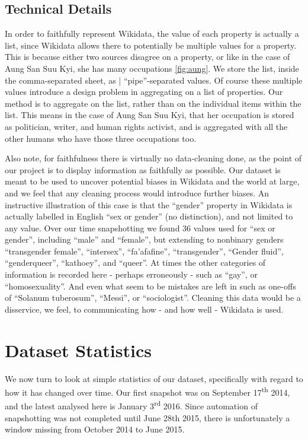 \documentclass[letterpaper]{article}
\begin{document}
\subsection{Technical Details}
In order to faithfully represent Wikidata, the value of each property is actually a list, since Wikidata allows there to potentially be multiple values for a property. This is because either two sources disagree on a property, or like in the case of Aung San Suu Kyi, she has many occupations \ref{fig:aung}. We store the list, inside the comma-separated sheet, as | ``pipe''-separated values. Of course these multiple values introduce a design problem in aggregating on a list of properties. Our method is to aggregate on the list, rather than on the individual items within the list. This means in the case of Aung San Suu Kyi, that her occupation is stored as politician, writer, and human rights activist, and is aggregated with all the other humans who have those three occupations too.

Also note, for faithfulness there is virtually no data-cleaning done, as the point of our project is to display information as faithfully as possible. Our dataset is meant to be used to uncover potential biases in Wikidata and the world at large, and we feel that any cleaning process would introduce further biases. An instructive illustration of this case is that the ``gender'' property in Wikidata is actually labelled in English ``sex or gender'' (no distinction), and not limited to any value. Over our time snapshotting we found 36 values used for ``sex or gender'', including ``male'' and ``female'', but extending to nonbinary genders ``transgender female'', ``intersex'', ``fa'afafine'', ``transgender'', ``Gender fluid'',  ``genderqueer'', ``kathoey'', and ``queer''. At times the other categories of information is recorded here - perhaps erroneously - such as ``gay'', or ``homosexuality''. And even what seem to be mistakes are left in such as one-offs of ``Solanum tuberosum'', ``Messi'', or ``sociologist''. Cleaning this data would be a disservice, we feel, to communicating how - and how well - Wikidata is used.

\section{Dataset Statistics}
We now turn to look at simple statistics of our dataset, specifically with regard to how it has changed over time. Our first snapshot was on September 17\textsuperscript{th} 2014, and the latest analysed here is January 3\textsuperscript{rd} 2016. Since automation of snapshotting was not completed until June 28th 2015, there is unfortunately a window missing from October 2014 to June 2015. 
\end{document}
